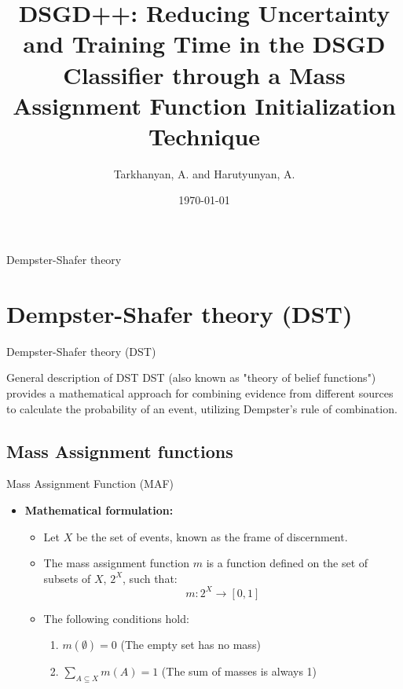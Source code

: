 \documentclass[aspectratio=169]{beamer}
\title{DSGD++: Reducing Uncertainty and Training Time in the DSGD Classifier through a Mass Assignment Function Initialization Technique}
\author{Tarkhanyan, A. and Harutyunyan, A.}
\date{\today}
\begin{document}
\begin{frame}
  \titlepage
\end{frame}

\begin{frame}
{\small\tableofcontents}
\end{frame}

\begin{frame}
    \begin{center}
        \Huge Dempster-Shafer theory
    \end{center}
\end{frame}

\section{Dempster-Shafer theory (DST)}
\begin{frame}{Dempster-Shafer theory (DST)}
    \begin{block}{General description of DST}
        DST (also known as "theory of belief functions") provides a
mathematical approach for combining evidence from different sources to calculate
the probability of an event, utilizing Dempster's rule of combination. 
        
    \end{block}
\end{frame}


\subsection{Mass Assignment functions}
\begin{frame}{Mass Assignment Function (MAF)}
  \begin{itemize}
    \item \textbf{Mathematical formulation:}
      \begin{itemize}
        \item Let \( X \) be the set of events, known as the frame of discernment. \pause
        \item The mass assignment function \( m \) is a function defined on the set of subsets of \( X \), \( 2^X \), such that:
          \[
          m : 2^X \rightarrow [0, 1]
          \]
        \pause
        \item The following conditions hold:
          \begin{enumerate}
            \item \( m(\emptyset) = 0 \) (The empty set has no mass)
            \item \( \sum\limits_{A \subseteq X} m(A) = 1 \) (The sum of masses is always 1)
          \end{enumerate}
      \end{itemize}
  \end{itemize}
\end{frame}
\end{document}
